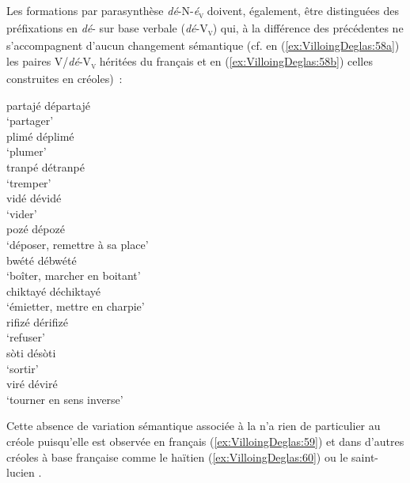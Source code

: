 \documentclass[output=paper]{langsci/langscibook}
\begin{document}
\label{préfixation-dé-v-sans-changement-sémantique}

Les formations par parasynthèse \emph{dé}-N-\emph{é}\textsubscript{\textsc{v}} doivent,
également, être distinguées des préfixations en \emph{dé}- sur base
verbale (\emph{dé}-V\textsubscript{\textsc{v}}) qui, à la différence des précédentes ne s'accompagnent
d'aucun changement sémantique (cf. en (\ref{ex:VilloingDeglas:58a}) les paires
V/\emph{dé}-V\textsubscript{\textsc{v}} héritées du français et en (\ref{ex:VilloingDeglas:58b}) celles
construites en créoles)~:

\ea \label{ex:VilloingDeglas:58a}
      \ea \gll partajé \textrightarrow{~} départajé\\
        {`partager'}\\
      \ex \gll  plimé \textrightarrow{~} déplimé\\
        {`plumer'}\\
      \ex \gll  tranpé \textrightarrow{~} détranpé\\
        {`tremper'}\\
      \ex \gll  vidé \textrightarrow{~} dévidé\\
        {`vider'}\\
      \ex   pozé \textrightarrow{~} dépozé\\
        {`déposer, remettre à sa place'}\\
      \z
\ex\label{ex:VilloingDeglas:58b}
      \ea   bwété \textrightarrow{~} débwété\\
        {`boîter, marcher en boitant'}\\
      \ex   chiktayé \textrightarrow{~} déchiktayé\\
        {`émietter, mettre en charpie'}\\
      \ex \gll  rifizé \textrightarrow{~} dérifizé\\
        {`refuser'}\\
      \ex \gll  sòti \textrightarrow{~} désòti\\
        {`sortir'}\\
      \ex   viré \textrightarrow{~} déviré\\
        {`tourner en sens inverse'}\\
\z\z


Cette absence de variation sémantique associée à la  n'a rien
de particulier au créole puisqu'elle est observée en français %
\citep{Muller90,Gerhard-Krait00,Apotheloz2007,Jalenques2014} %
%
(\ref{ex:VilloingDeglas:59}) et dans
d'autres créoles à base française comme le haïtien %
\citep{Filipovich87,Lefebvre2003,Valdman1981} %
%
(\ref{ex:VilloingDeglas:60}) ou le saint-lucien %
\citep[74]{Brousseau11}
.
\end{document}
